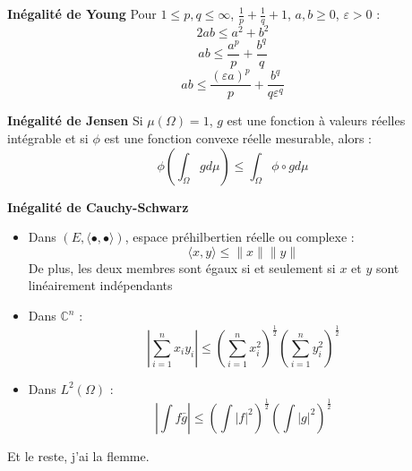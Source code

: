 \bigskip
\textbf{Inégalité de Young} Pour $1\leq p,q\leq \infty$, $\frac{1}{p}+\frac{1}{q}+1$, $a,b\geq 0$, $\varepsilon>0$ :
	\[2ab\leq a^2+b^2\]
	\[ab\leq \frac{a^p}{p}+\frac{b^q}{q}\]
	\[ab\leq\frac{(\varepsilon a)^p}{p}+\frac{b^q}{q\varepsilon^q}\]

\bigskip
\textbf{Inégalité de Jensen} Si $\mu(\Omega)=1$, $g$ est une fonction à valeurs réelles intégrable et si $\phi$ est une fonction convexe réelle mesurable, alors :
	\[\phi\left(\int_\Omega gd\mu\right)\leq \int_\Omega \phi\circ gd\mu\]

\bigskip
\textbf{Inégalité de Cauchy-Schwarz} \begin{itemize}
\item Dans $(E,\langle \bullet, \bullet \rangle)$, espace préhilbertien réelle ou complexe : 
	\[\langle x,y\rangle\leq \|x\|\|y\|\]
De plus, les deux membres sont égaux si et seulement si $x$ et $y$ sont linéairement indépendants
\item Dans $\mathbb{C}^n$ : \[\left|\sum_{i=1}^n x_iy_i \right|\leq \left( \sum_{i=1}^n x_i^2\right)^{\frac{1}{2}}\left( \sum_{i=1}^n y_i^2\right)^{\frac{1}{2}}\]
\item Dans $L^2(\Omega)$ : \[\left|\int f\bar{g}\right|\leq \left( \int |f|^2\right)^{\frac{1}{2}}\left( \int |g|^2\right)^{\frac{1}{2}}\]
\end{itemize}

Et le reste, j'ai la flemme.
